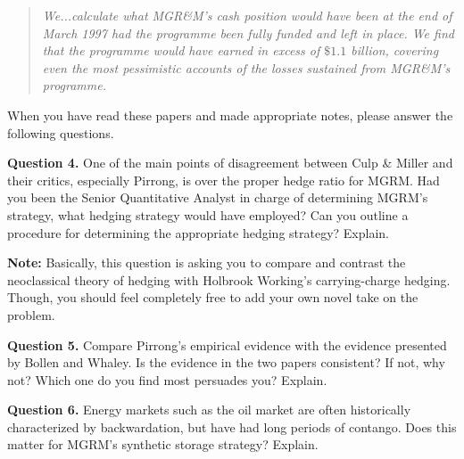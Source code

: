\documentclass[12pt]{article}
\begin{document}
\begin{quote}
	\textit{We...calculate what MGR\&M's cash position would have been at the end of March 1997 had the programme been fully funded and left in place. We find that the 
	programme would have earned in excess of $\$1.1$ billion, covering even the most pessimistic accounts of the losses sustained from MGR\&M's programme.}
\end{quote}

\vspace{10mm}

When you have read these papers and made appropriate notes, please answer the following questions.

\vspace{10mm}

\textbf{Question 4.} One of the main points of disagreement between Culp \& Miller and their critics, especially Pirrong, is over the proper hedge ratio for MGRM. 
Had you been the Senior Quantitative Analyst in charge of determining MGRM's strategy, what hedging strategy would have employed? Can you outline a procedure for
determining the appropriate hedging strategy? Explain. 

\vspace{8mm}

\textbf{Note:} Basically, this question is asking you to compare and contrast the neoclassical theory of hedging with Holbrook Working's carrying-charge hedging. Though,
you should feel completely free to add your own novel take on the problem.

\vspace{10mm}

\textbf{Question 5.} Compare Pirrong's empirical evidence with the evidence presented by Bollen and Whaley. Is the evidence in the two papers consistent? If not, why not?
Which one do you find most persuades you? Explain.

\vspace{10mm}

\textbf{Question 6.} Energy markets such as the oil market are often historically characterized by backwardation, but have had long periods of contango. Does this matter
for MGRM's synthetic storage strategy? Explain.

\vspace{10mm}
\end{document}
